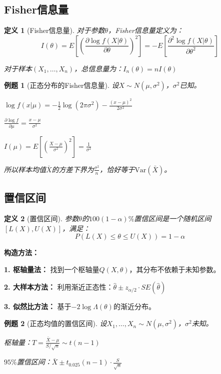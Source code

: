 \documentclass[12pt,a4paper]{article}
\newtheorem{definition}{定义}[section]
\newtheorem{example}{例题}[section]
\theoremstyle{remark}
\begin{document}
\subsection{Fisher信息量}

\begin{definition}[Fisher信息量]
对于参数$\theta$，Fisher信息量定义为：
$$I(\theta) = E\left[\left(\frac{\partial \log f(X|\theta)}{\partial \theta}\right)^2\right] = -E\left[\frac{\partial^2 \log f(X|\theta)}{\partial \theta^2}\right]$$

对于样本$(X_1, \ldots, X_n)$，总信息量为：$I_n(\theta) = nI(\theta)$
\end{definition}

\begin{example}[正态分布的Fisher信息量]
设$X \sim N(\mu, \sigma^2)$，$\sigma^2$已知。

$\log f(x|\mu) = -\frac{1}{2}\log(2\pi\sigma^2) - \frac{(x-\mu)^2}{2\sigma^2}$

$\frac{\partial \log f}{\partial \mu} = \frac{x-\mu}{\sigma^2}$

$I(\mu) = E\left[\left(\frac{X-\mu}{\sigma^2}\right)^2\right] = \frac{1}{\sigma^2}$

所以样本均值$\bar{X}$的方差下界为$\frac{\sigma^2}{n}$，恰好等于$\text{Var}(\bar{X})$。
\end{example}

\subsection{置信区间}

\begin{definition}[置信区间]
参数$\theta$的$100(1-\alpha)\%$置信区间是一个随机区间$[L(X), U(X)]$，满足：
$$P(L(X) \leq \theta \leq U(X)) = 1-\alpha$$
\end{definition}

\textbf{构造方法：}

\textbf{1. 枢轴量法：}
找到一个枢轴量$Q(X, \theta)$，其分布不依赖于未知参数。

\textbf{2. 大样本方法：}
利用渐近正态性：$\hat{\theta} \pm z_{\alpha/2} \cdot SE(\hat{\theta})$

\textbf{3. 似然比方法：}
基于$-2\log\Lambda(\theta)$的渐近分布。

\begin{example}[正态均值的置信区间]
设$X_1, \ldots, X_n \sim N(\mu, \sigma^2)$，$\sigma^2$未知。

枢轴量：$T = \frac{\bar{X} - \mu}{S/\sqrt{n}} \sim t(n-1)$

$95\%$置信区间：$\bar{X} \pm t_{0.025}(n-1) \cdot \frac{S}{\sqrt{n}}$
\end{example}
\end{document}
